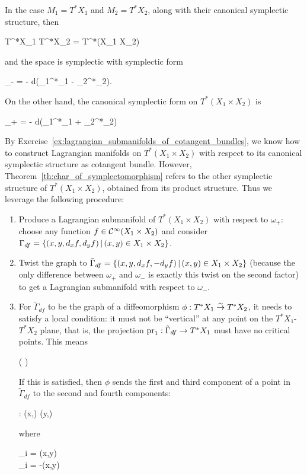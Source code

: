 \documentclass[main.tex]{subfiles}
\begin{document}
\begin{construction}
	In the case $M_1 = T^*X_1$ and $M_2 = T^*X_2$, along with their canonical symplectic structure, then
	\begin{eqalign}
		T^*X_1 \times T^*X_2 = T^*(X_1 \times X_2)
	\end{eqalign}
	and the space is symplectic with symplectic form
	\begin{eqalign}
		\omega_- = - d(\pr_1^*\alpha_1 - \pr_2^*\alpha_2).
	\end{eqalign}
	On the other hand, the canonical symplectic form on $T^*(X_1 \times X_2)$ is
	\begin{eqalign}
		\omega_+ = - d(\pr_1^*\alpha_1 + \pr_2^*\alpha_2)
	\end{eqalign}
	By Exercise~\ref{ex:lagrangian_submanifolds_of_cotangent_bundles}, we know how to construct Lagrangian manifolds on $T^*(X_1 \times X_2)$ with respect to its canonical symplectic structure as cotangent bundle. However, Theorem~\ref{th:char_of_symplectomorphism} refers to the other symplectic structure of $T^*(X_1 \times X_2)$, obtained from its product structure. Thus we leverage the following procedure:
	\begin{enumerate}
		\item Produce a Lagrangian submanifold of $T^*(X_1 \times X_2)$ with respect to $\omega_+$: choose any function $f \in \mathcal{C}^\infty(X_1 \times X_2)$ and consider $\Gamma_{df} = \{(x,y,d_x f, d_y f) \,|\, (x,y) \in X_1 \times X_2\}$.
		\item Twist the graph to $\tilde\Gamma_{df} = \{(x,y,d_xf,-d_yf) \,|\, (x,y) \in X_1 \times X_2\}$ (because the only difference between $\omega_+$ and $\omega_-$ is exactly this twist on the second factor) to get a Lagrangian submanifold with respect to $\omega_-$.
		\item For $\tilde\Gamma_{df}$ to be the graph of a diffeomorphism $\phi : T^*X_1 \overset{\sim}\to T^*X_2$, it needs to satisfy a local condition: it must not be ``vertical'' at any point on the $T^*X_1$-$T^*X_2$ plane, that is, the projection $\mathrm{pr}_1 : \tilde\Gamma_{df} \to T^*X_1$ must have no critical points. This means
		\begin{eqalign}
			\det \left(  \right) \neq 0
		\end{eqalign}
		If this is satisfied, then $\phi$ sends the first and third component of a point in $\tilde\Gamma_{df}$ to the second and fourth components:
		\begin{eqalign}
			\phi : (x,\xi) \mapsto (y,\eta)
		\end{eqalign}
		where
		\begin{eqalign}
		\label{eq:canonical_transf_from_gen_funcs}
			\begin{cases}
				\xi_i = \bigpder{f}{x^i}(x,y)\\
				\eta_i = -\bigpder{f}{y^i}(x,y)
			\end{cases}
		\end{eqalign}
	\end{enumerate}
\end{construction}
\end{document}
